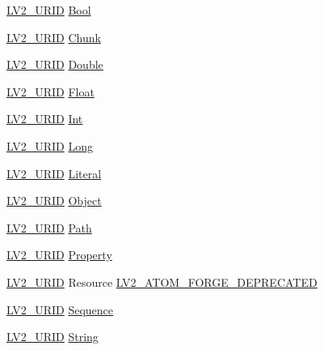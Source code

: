 \begin{DoxyCompactItemize}
\item 
\hyperlink{urid_8h_a5ff0630d245539e9f6dca10ff3c40fae}{L\+V2\+\_\+\+U\+R\+ID} \hyperlink{struct_l_v2___atom___forge_aa9edbb6b79c332e24810530fde3797d1}{Bool}
\item 
\hyperlink{urid_8h_a5ff0630d245539e9f6dca10ff3c40fae}{L\+V2\+\_\+\+U\+R\+ID} \hyperlink{struct_l_v2___atom___forge_a34f0a317c1586b5ac2b69606e52421ed}{Chunk}
\item 
\hyperlink{urid_8h_a5ff0630d245539e9f6dca10ff3c40fae}{L\+V2\+\_\+\+U\+R\+ID} \hyperlink{struct_l_v2___atom___forge_a7f3a264907ebcb9629c0fcab0bbad30f}{Double}
\item 
\hyperlink{urid_8h_a5ff0630d245539e9f6dca10ff3c40fae}{L\+V2\+\_\+\+U\+R\+ID} \hyperlink{struct_l_v2___atom___forge_a00e18b90ae1a1ea6cef061c1572aad5e}{Float}
\item 
\hyperlink{urid_8h_a5ff0630d245539e9f6dca10ff3c40fae}{L\+V2\+\_\+\+U\+R\+ID} \hyperlink{struct_l_v2___atom___forge_a6602b2a9838bb2349ac42e4deb84fc4b}{Int}
\item 
\hyperlink{urid_8h_a5ff0630d245539e9f6dca10ff3c40fae}{L\+V2\+\_\+\+U\+R\+ID} \hyperlink{struct_l_v2___atom___forge_a4ddfa8596ca6067c0eb5203a945e395a}{Long}
\item 
\hyperlink{urid_8h_a5ff0630d245539e9f6dca10ff3c40fae}{L\+V2\+\_\+\+U\+R\+ID} \hyperlink{struct_l_v2___atom___forge_adecbead2046bf6421ee2918d376af36a}{Literal}
\item 
\hyperlink{urid_8h_a5ff0630d245539e9f6dca10ff3c40fae}{L\+V2\+\_\+\+U\+R\+ID} \hyperlink{struct_l_v2___atom___forge_aeb34e038d80078e2d86cf6dfcf81e4ee}{Object}
\item 
\hyperlink{urid_8h_a5ff0630d245539e9f6dca10ff3c40fae}{L\+V2\+\_\+\+U\+R\+ID} \hyperlink{struct_l_v2___atom___forge_a85302bd09eaf23908243f4e1f5c09a51}{Path}
\item 
\hyperlink{urid_8h_a5ff0630d245539e9f6dca10ff3c40fae}{L\+V2\+\_\+\+U\+R\+ID} \hyperlink{struct_l_v2___atom___forge_a266bf7ee4c8b059631a303b64975042c}{Property}
\item 
\hyperlink{urid_8h_a5ff0630d245539e9f6dca10ff3c40fae}{L\+V2\+\_\+\+U\+R\+ID} Resource \hyperlink{struct_l_v2___atom___forge_a83e1b24b62ec20dd2649c4587fe467b7}{L\+V2\+\_\+\+A\+T\+O\+M\+\_\+\+F\+O\+R\+G\+E\+\_\+\+D\+E\+P\+R\+E\+C\+A\+T\+ED}
\item 
\hyperlink{urid_8h_a5ff0630d245539e9f6dca10ff3c40fae}{L\+V2\+\_\+\+U\+R\+ID} \hyperlink{struct_l_v2___atom___forge_ab7f59a27275a83a6a597a89462b055ee}{Sequence}
\item 
\hyperlink{urid_8h_a5ff0630d245539e9f6dca10ff3c40fae}{L\+V2\+\_\+\+U\+R\+ID} \hyperlink{struct_l_v2___atom___forge_ac03dd46bff7d441a84486f1f5a6ce5b7}{String}

\end{DoxyCompactItemize}
